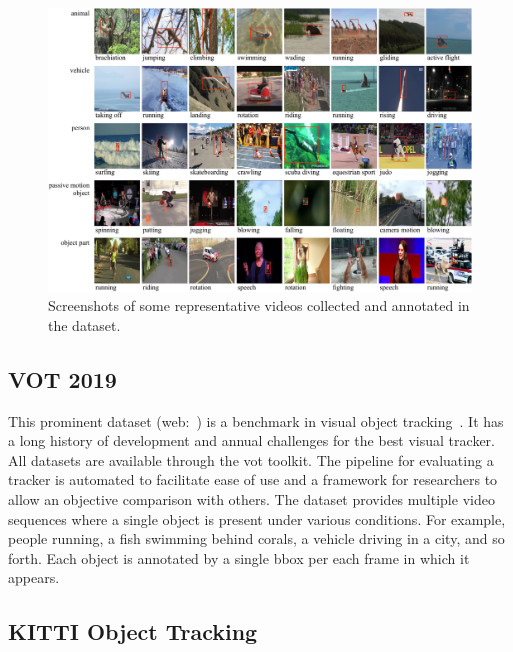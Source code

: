 \begin{figure}[t]
    \centerline{\includegraphics[width=\linewidth]{figures/datasets/got10k_sample.pdf}}
    \caption[ dataset]{Screenshots of some representative videos collected and annotated in the  dataset. }
    \label{fig:DatasetGOT10k}
\end{figure}

\subsection{VOT 2019}
\label{ssec:DatasetVOT2019}


This prominent dataset (web:~\cite{vot2019dataset}) is a benchmark in visual object tracking~\cite{Kristan2019a}. It has a long history of development and annual challenges for the best visual tracker. All  datasets are available through the \gls{vot} toolkit. The pipeline for evaluating a tracker is automated to facilitate ease of use and a framework for researchers to allow an objective comparison with others. The dataset provides multiple video sequences where a single object is present under various conditions. For example, people running, a fish swimming behind corals, a vehicle driving in a city, and so forth. Each object is annotated by a single \gls{bbox} per each frame in which it appears.

\subsection{KITTI Object Tracking}
\label{ssec:DatasetKITTIObjectTracking}

